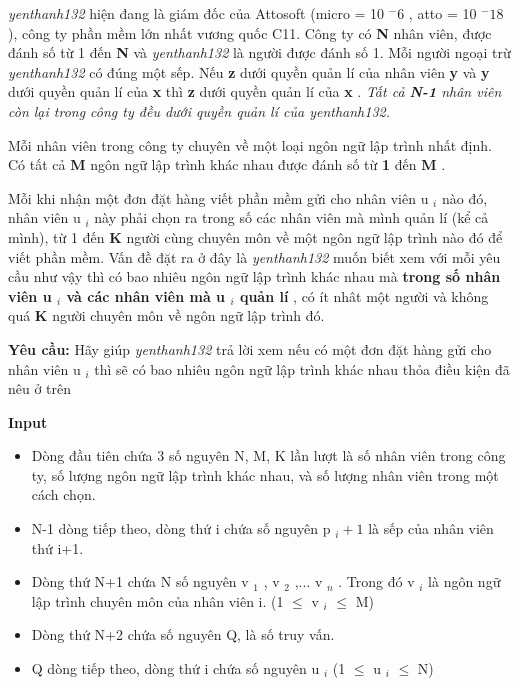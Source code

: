 



\emph{    yenthanh132   }   hiện đang là giám đốc của Attosoft (micro = 10   $^    -6   $   , atto = 10   $^    -18   $   ), công ty phần mềm lớn nhất vương quốc C11. Công ty có   \textbf{    N   }   nhân viên, được đánh số từ 1 đến   \textbf{    N   }   và   \emph{    yenthanh132   }   là người được đánh số 1. Mỗi người ngoại trừ   \emph{    yenthanh132   }   có đúng một sếp. Nếu   \textbf{    z   }   dưới quyền quản lí của nhân viên   \textbf{    y   }   và   \textbf{    y   }   dưới quyền quản lí của   \textbf{    x   }   thì   \textbf{    z   }   dưới quyền quản lí của   \textbf{    x   }   .   \emph{    Tất cả    \textbf{     N-1    }    nhân viên còn lại trong công ty đều dưới quyền quản lí của yenthanh132.   }

   Mỗi nhân viên trong công ty chuyên về một loại ngôn ngữ lập trình nhất định. Có tất cả   \textbf{    M   }   ngôn ngữ lập trình khác nhau được đánh số từ   \textbf{    1   }   đến   \textbf{    M   }   .  

   Mỗi khi nhận một đơn đặt hàng viết phần mềm gửi cho nhân viên u   $_    i   $   nào đó, nhân viên u   $_    i   $   này phải chọn ra trong số các nhân viên mà mình quản lí (kể cả mình), từ 1 đến   \textbf{    K   }   người cùng chuyên môn về một ngôn ngữ lập trình nào đó để viết phần mềm. Vấn đề đặt ra ở đây là   \emph{    yenthanh132   }   muốn biết xem với mỗi yêu cầu như vậy thì có bao nhiêu ngôn ngữ lập trình khác nhau mà   \textbf{    trong số nhân viên u    $_     i    $    và các nhân viên mà u    $_     i    $    quản lí   }   , có ít nhât một người và không quá   \textbf{    K   }   người chuyên môn về ngôn ngữ lập trình đó.  

\textbf{    Yêu cầu:   }   Hãy giúp   \emph{    yenthanh132   }   trả lời xem nếu có một đơn đặt hàng gửi cho nhân viên u   $_    i   $   thì sẽ có bao nhiêu ngôn ngữ lập trình khác nhau thỏa điều kiện đã nêu ở trên  

\textbf{    Input   }
\begin{itemize}
	\item     Dòng đầu tiên chứa 3 số nguyên N,      M, K lần lượt là số nhân viên trong công ty, số lượng ngôn ngữ lập trình      khác nhau, và số lượng nhân viên trong một cách chọn.   
	\item     N-1 dòng tiếp theo, dòng thứ i chứa số nguyên      p    $_     i+1    $    là sếp của nhân viên thứ i+1.   
	\item     Dòng thứ N+1 chứa N số nguyên v    $_     1    $    ,      v    $_     2    $    ,... v    $_     n    $    . Trong đó v    $_     i    $    là ngôn ngữ lập      trình chuyên môn của nhân viên i. (1  $\le$  v    $_     i    $     $\le$  M)   
	\item     Dòng thứ N+2 chứa số nguyên Q, là      số truy vấn.   
	\item     Q dòng tiếp theo, dòng thứ i chứa      số nguyên u    $_     i    $    (1  $\le$  u    $_     i    $     $\le$  N)   
\end{itemize}

